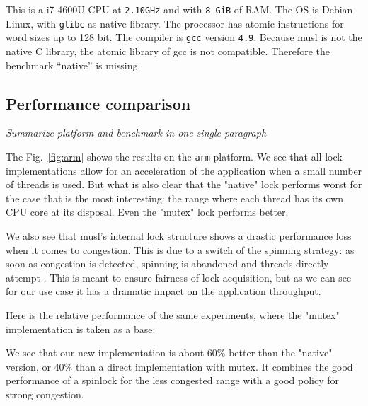 This is a i7-4600U CPU at \texttt{2.10GHz} and with \texttt{8 GiB} of RAM. The
OS is Debian Linux, with \texttt{glibc} as native library.  The processor
has atomic instructions for word sizes up to 128 bit. The compiler
is \texttt{gcc} version \texttt{4.9}.
%
Because musl is not the native C library, the atomic library of gcc is not
compatible. Therefore the benchmark ``native'' is missing.

\subsection{Performance comparison}
\label{sec-4-4}
\else
\emph{Summarize platform and benchmark in one single paragraph}
\fi


The Fig.~\ref{fig:arm} shows the results on the \texttt{arm}
platform.
%
We see that all lock implementations allow for an acceleration of
the application when a small number of threads is used. But what is
also clear that the "native" lock performs worst for the case that
is the most interesting: the range where each thread has
its own CPU core at its disposal. Even the "mutex" lock performs better.

We also see that musl's internal lock structure shows a drastic
performance loss when it comes to congestion. This is due to a
switch of the spinning strategy: as soon as congestion is detected,
spinning is abandoned and threads directly attempt
. This is meant to ensure fairness of lock acquisition,
but as we can see for our use case it has a dramatic impact on the
application throughput.

Here is the relative performance of the same experiments, where the
"mutex" implementation is taken as a base:

We see that our new implementation is about 60\% better than
the "native" version, or 40\% than a direct implementation with
mutex. It combines the good performance of a spinlock for the less
congested range with a good policy for strong congestion.

